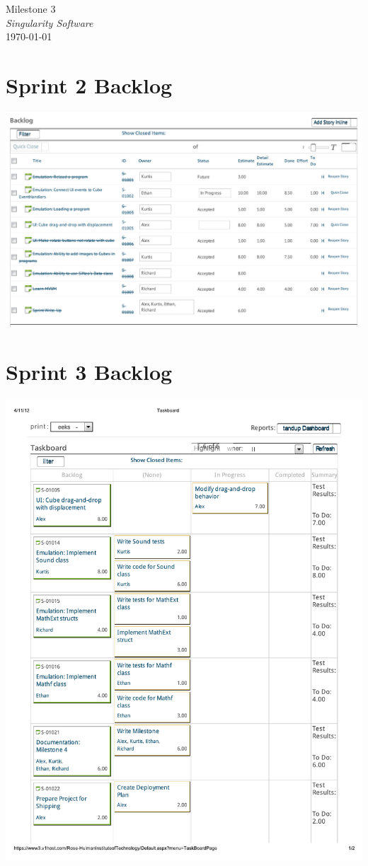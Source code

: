 \documentclass[12pt]{article}
\begin{document}
\begin{center}
	\LARGE{Milestone 3} \\
	\Large{\textit{Singularity Software}} \\
	\vspace{.05in}
	\normalsize{\today} \\
\end{center}

\section*{Sprint 2 Backlog}
\includegraphics[scale=.63]{pdfs/MS2VersionOne/OldSprintBacklog_cropped.pdf}

\clearpage

\section*{Sprint 3 Backlog}
\includegraphics[scale=.85]{pdfs/MS3VersionOne/Taskboard.pdf}
\end{document}
